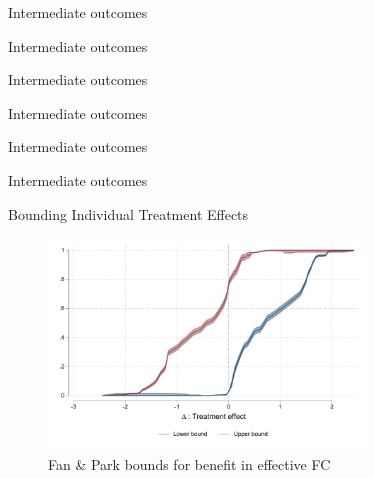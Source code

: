 \documentclass[8pt]{beamer}
\begin{document}
\begin{frame}{Intermediate outcomes}
\label{mechanism_appendix}

\begin{table}[H]
\caption{Intermediate outcomes}
\begin{center}
\footnotesize{}
\end{center}
\end{table}
\vfill
\hyperlink{intermediate_outcomes}{}
\end{frame}

\begin{frame}{Intermediate outcomes}

\begin{table}[H]
\caption{Intermediate outcomes}
\begin{center}
\footnotesize{}
\end{center}
\end{table}
\vfill
\hyperlink{intermediate_outcomes}{}
\end{frame}


\begin{frame}{Intermediate outcomes}

    \begin{table}[H]
\caption{Intermediate outcomes}
\begin{center}
\footnotesize{}
\end{center}
\end{table}
\vfill
\hyperlink{intermediate_outcomes}{}
\end{frame}






\begin{frame}{Bounding Individual Treatment Effects}
\label{fan_park_bounds}    

\begin{figure}[H]
    \caption{Fan \& Park bounds for benefit in effective FC }
    
    \begin{center}
        \includegraphics[width=0.75\textwidth]{Figuras/fan_park_bounds_fc_admin.pdf}
    \end{center}
   
\end{figure}
 \hyperlink{choice_hte}{}
\end{frame}
\end{document}
